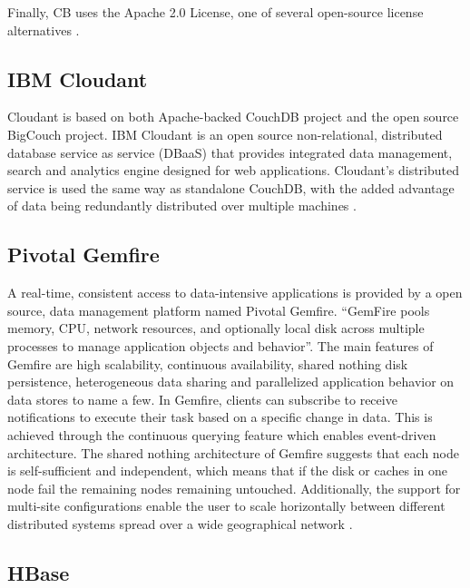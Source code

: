 {     Finally, CB uses the Apache 2.0 License, one of several
     open-source license alternatives \cite{www-quora-cbs}.


     \pv

\subsection{IBM Cloudant}
     
     Cloudant is based on both Apache-backed CouchDB project and the
     open source BigCouch project. IBM Cloudant is an open source
     non-relational, distributed database service as service (DBaaS)
     that provides integrated data management, search and analytics 
     engine designed for web applications. Cloudant's distributed
     service is used the same way as standalone CouchDB, with the
     added advantage of data being redundantly distributed over
     multiple machines \cite{www-ibm-cloudant}.
   

\subsection{Pivotal Gemfire}
     
     A real-time, consistent access to data-intensive applications is
     provided by a open source, data management platform named Pivotal
     Gemfire. ``GemFire pools memory, CPU, network resources, and
     optionally local disk across multiple processes to manage
     application objects and behavior''. The main features of Gemfire
     are high scalability, continuous availability, shared nothing
     disk persistence, heterogeneous data sharing and parallelized
     application behavior on data stores to name a few.  In Gemfire,
     clients can subscribe to receive notifications to execute their
     task based on a specific change in data. This is achieved through
     the continuous querying feature which enables event-driven
     architecture. The shared nothing architecture of Gemfire suggests
     that each node is self-sufficient and independent, which means
     that if the disk or caches in one node fail the remaining nodes
     remaining untouched. Additionally, the support for multi-site
     configurations enable the user to scale horizontally between
     different distributed systems spread over a wide geographical
     network \cite{www-gemfire}.
     
\subsection{HBase}

}
